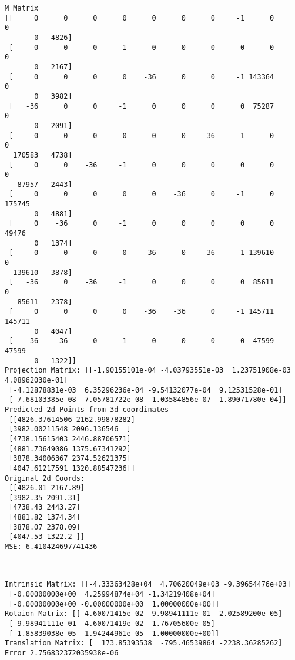 \documentclass[11pt]{article}
\begin{document}
    \begin{Verbatim}[commandchars=\\\{\}]
M Matrix
[[     0      0      0      0      0      0      0     -1      0      0
       0   4826]
 [     0      0      0     -1      0      0      0      0      0      0
       0   2167]
 [     0      0      0      0    -36      0      0     -1 143364      0
       0   3982]
 [   -36      0      0     -1      0      0      0      0  75287      0
       0   2091]
 [     0      0      0      0      0      0    -36     -1      0      0
  170583   4738]
 [     0      0    -36     -1      0      0      0      0      0      0
   87957   2443]
 [     0      0      0      0      0    -36      0     -1      0 175745
       0   4881]
 [     0    -36      0     -1      0      0      0      0      0  49476
       0   1374]
 [     0      0      0      0    -36      0    -36     -1 139610      0
  139610   3878]
 [   -36      0    -36     -1      0      0      0      0  85611      0
   85611   2378]
 [     0      0      0      0    -36    -36      0     -1 145711 145711
       0   4047]
 [   -36    -36      0     -1      0      0      0      0  47599  47599
       0   1322]]
Projection Matrix: [[-1.90155101e-04 -4.03793551e-03  1.23751908e-03  4.08962030e-01]
 [-4.12878831e-03  6.35296236e-04 -9.54132077e-04  9.12531528e-01]
 [ 7.68103385e-08  7.05781722e-08 -1.03584856e-07  1.89071780e-04]]
Predicted 2d Points from 3d coordinates
 [[4826.37614506 2162.99878282]
 [3982.00211548 2096.136546  ]
 [4738.15615403 2446.88706571]
 [4881.73649086 1375.67341292]
 [3878.34006367 2374.52621375]
 [4047.61217591 1320.88547236]]
Original 2d Coords:
 [[4826.01 2167.89]
 [3982.35 2091.31]
 [4738.43 2443.27]
 [4881.82 1374.34]
 [3878.07 2378.09]
 [4047.53 1322.2 ]]
MSE: 6.410424697741436

    \end{Verbatim}

    \begin{center}
    \end{center}
    { \hspace*{\fill} \\}
    
    \begin{Verbatim}[commandchars=\\\{\}]
Intrinsic Matrix: [[-4.33363428e+04  4.70620049e+03 -9.39654476e+03]
 [-0.00000000e+00  4.25994874e+04 -1.34219408e+04]
 [-0.00000000e+00 -0.00000000e+00  1.00000000e+00]]
Rotaion Matrix: [[-4.60071415e-02  9.98941111e-01  2.02589200e-05]
 [-9.98941111e-01 -4.60071419e-02  1.76705600e-05]
 [ 1.85839038e-05 -1.94244961e-05  1.00000000e+00]]
Translation Matrix: [  173.85393538  -795.46539864 -2238.36285262]
Error 2.756832372035938e-06

    \end{Verbatim}
\end{document}
